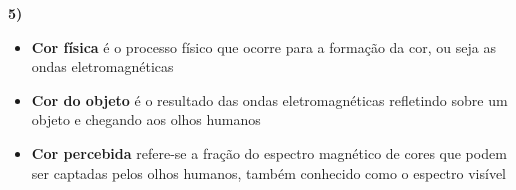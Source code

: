 \textbf{5)} 

\begin{itemize}
	\item \textbf{Cor física} é o processo físico que ocorre para a 
	formação da cor, ou seja as ondas eletromagnéticas
	
	\item \textbf{Cor do objeto} é o resultado das ondas eletromagnéticas 
	refletindo sobre um objeto e chegando aos olhos humanos
	
	\item \textbf{Cor percebida} refere-se a fração do espectro magnético de
	cores que podem ser captadas pelos olhos humanos, também conhecido como 
	o espectro visível
\end{itemize}